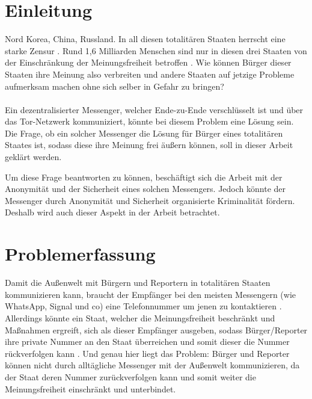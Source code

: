 \documentclass[a4paper,ngerman, headheight=28pt,12pt]{scrartcl}
\newcommand{\vcite}[1]{\cite[vgl.][]{#1}}
\begin{document}

\tableofcontents
\setcounter{page}{0}
\thispagestyle{empty}
\vspace{0.5cm}
\pagebreak


\linenumbers{}
\modulolinenumbers[5]

\section{Einleitung}
Nord Korea, China, Russland. In all diesen totalitären Staaten herrscht eine starke Zensur \vcite{AmnReport}. %
Rund 1,6 Milliarden Menschen sind nur in diesen drei Staaten von der Einschränkung der Meinungsfreiheit betroffen \vcite{UnPop}. Wie können Bürger dieser Staaten ihre Meinung also verbreiten und andere Staaten auf jetzige Probleme aufmerksam machen ohne sich selber in Gefahr zu bringen?
\\
\\
Ein dezentralisierter Messenger, welcher Ende-zu-Ende verschlüsselt ist und über das Tor-Netzwerk kommuniziert, könnte bei diesem Problem eine Lösung sein. Die Frage, ob ein solcher Messenger die Lösung für Bürger eines totalitären Staates ist, sodass diese ihre Meinung frei äußern können, soll in dieser Arbeit geklärt werden.

Um diese Frage beantworten zu können, beschäftigt sich die Arbeit mit der Anonymität und der Sicherheit eines solchen Messengers. Jedoch könnte der Messenger durch Anonymität und Sicherheit organisierte Kriminalität fördern. Deshalb wird auch dieser Aspekt in der Arbeit betrachtet.


\section{Problemerfassung}
Damit die Außenwelt mit Bürgern und Reportern in totalitären Staaten kommunizieren kann, braucht der Empfänger bei den meisten Messengern (wie WhatsApp, Signal und co) eine Telefonnummer um jenen zu kontaktieren \vcite{WhatsappContacts, SignalSend}. Allerdings könnte ein Staat, welcher die Meinungsfreiheit beschränkt und Maßnahmen ergreift, sich als dieser Empfänger ausgeben, sodass Bürger/Reporter ihre private Nummer an den Staat überreichen und somit dieser die Nummer rückverfolgen kann \vcite{LocPolice}. %
Und genau hier liegt das Problem: Bürger und Reporter können nicht durch alltägliche Messenger mit der Außenwelt kommunizieren, da der Staat deren Nummer zurückverfolgen kann und somit weiter die Meinungsfreiheit einschränkt und unterbindet.
\end{document}

